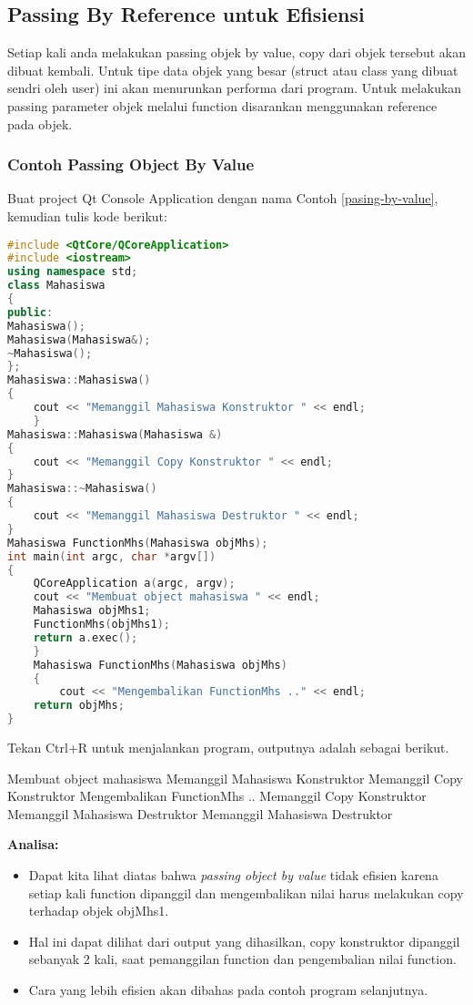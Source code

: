 \subsection{Passing By Reference untuk
Efisiensi}\label{passing-by-reference-untuk-efisiensi}

Setiap kali anda melakukan passing objek by value, copy dari objek
tersebut akan dibuat kembali. Untuk tipe data objek yang besar (struct
atau class yang dibuat sendri oleh user) ini akan menurunkan performa
dari program. Untuk melakukan passing parameter objek melalui function
disarankan menggunakan reference pada objek.

\subsubsection*{Contoh  Passing Object By Value}

Buat project Qt Console Application dengan nama Contoh \ref{pasing-by-value}, kemudian
tulis kode berikut:

\begin{lstlisting}[language=c++, caption=Passing Object By Value, label=pasing-by-value]
#include <QtCore/QCoreApplication>
#include <iostream>
using namespace std;
class Mahasiswa
{
public:
Mahasiswa();
Mahasiswa(Mahasiswa&);
~Mahasiswa();
};
Mahasiswa::Mahasiswa()
{
    cout << "Memanggil Mahasiswa Konstruktor " << endl;
    }
Mahasiswa::Mahasiswa(Mahasiswa &)
{
    cout << "Memanggil Copy Konstruktor " << endl;
}
Mahasiswa::~Mahasiswa()
{
    cout << "Memanggil Mahasiswa Destruktor " << endl;
}
Mahasiswa FunctionMhs(Mahasiswa objMhs);
int main(int argc, char *argv[])
{
    QCoreApplication a(argc, argv);
    cout << "Membuat object mahasiswa " << endl;
    Mahasiswa objMhs1;
    FunctionMhs(objMhs1);
    return a.exec();
    }
    Mahasiswa FunctionMhs(Mahasiswa objMhs)
    {
        cout << "Mengembalikan FunctionMhs .." << endl;
    return objMhs;
}
\end{lstlisting}

Tekan Ctrl+R untuk menjalankan program, outputnya adalah sebagai
berikut.

\begin{lcverbatim}
Membuat object mahasiswa
Memanggil Mahasiswa Konstruktor
Memanggil Copy Konstruktor
Mengembalikan FunctionMhs ..
Memanggil Copy Konstruktor
Memanggil Mahasiswa Destruktor
Memanggil Mahasiswa Destruktor
\end{lcverbatim}

\textbf{Analisa:}

\begin{itemize}
\tightlist
\item
  Dapat kita lihat diatas bahwa \emph{passing object by value} tidak
  efisien karena setiap kali function dipanggil dan mengembalikan nilai
  harus melakukan copy terhadap objek objMhs1.
\item
  Hal ini dapat dilihat dari output yang dihasilkan, copy konstruktor
  dipanggil sebanyak 2 kali, saat pemanggilan function dan pengembalian
  nilai function.
\item
  Cara yang lebih efisien akan dibahas pada contoh program selanjutnya.
\end{itemize}

